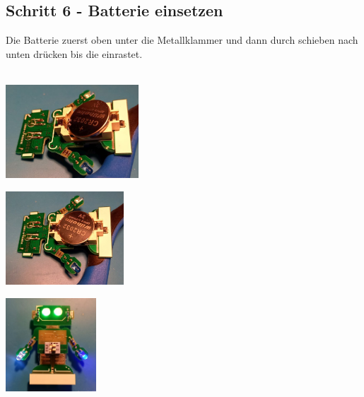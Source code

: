 \documentclass[a4paper]{article}
\begin{document}
\subsection{Schritt 6 - Batterie einsetzen}
Die Batterie zuerst oben unter die Metallklammer und dann durch schieben nach unten drücken bis die einrastet.\\
\ \\
\begin{minipage}[t]{0.33\textwidth}
  \centering
  \includegraphics[height=3.5cm]{../pictures/Bat4.jpg}
  \label{img:Bat4}
  \end{minipage}
\begin{minipage}[t]{0.33\textwidth}
  \centering
  \includegraphics[height=3.5cm]{../pictures/Bat5.jpg}
  \label{img:Bat5}
\end{minipage}
\begin{minipage}[t]{0.33\textwidth}
  \centering
  \includegraphics[height=3.5cm]{../pictures/Ready.jpg}
  \label{img:Ready}
\end{minipage}
\end{document}

